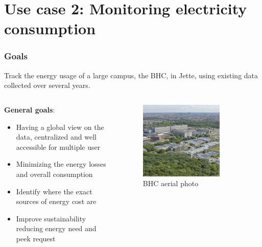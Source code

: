 \section{Use case 2: Monitoring electricity consumption}
\SectionPage

\begin{frame}
    \frametitle{Goals}
    \vspace*{\fill}
    Track the energy usage of a large campus, the \ac{BHC}, in Jette, using existing data collected over several years.

    \begin{columns}[onlytextwidth, c]
        \begin{column}{.47\textwidth}
            \textbf{General goals}:
            \begin{itemize}
                \item Having a global view on the data, centralized and well accessible for multiple user
                \item Minimizing the energy losses and overall consumption
                \item Identify where the exact sources of energy cost are
                \item Improve sustainability reducing energy need and peek request
            \end{itemize}
        \end{column}
        \begin{column}{.52\textwidth}
            \begin{figure}[ht]
                \includegraphics[width=0.78\textwidth]{frames/figures/jette_luchtfoto.jpg}
                \caption{\ac{BHC} aerial photo}
            \end{figure}
        \end{column}
    \end{columns}
    \vspace*{\fill}
\end{frame}

